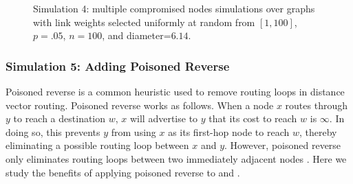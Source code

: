 \begin{figure}
\centering
{}
\caption{Simulation 4: multiple compromised nodes simulations over \er graphs with link weights selected uniformly at random from $[1,100]$, $p=.05$, $n=100$, and diameter=$6.14$. }
\label{fig:many}
\end{figure}

\subsubsection{Simulation 5:  Adding Poisoned Reverse}
Poisoned reverse is a common heuristic used to remove routing loops in distance vector routing.   Poisoned reverse works as follows. 
When a node $x$ routes through $y$ to reach a destination $w$, $x$ will advertise to $y$ that its cost to reach $w$ is $\infty$.  In doing so, this prevents $y$ from using $x$ as its first-hop
node to reach $w$, thereby eliminating a possible routing loop between $x$ and $y$.  However, poisoned reverse only eliminates routing loops between two immediately adjacent nodes \cite{Kurose03}.
Here we study the benefits of applying poisoned reverse to \second and \cprs. 

